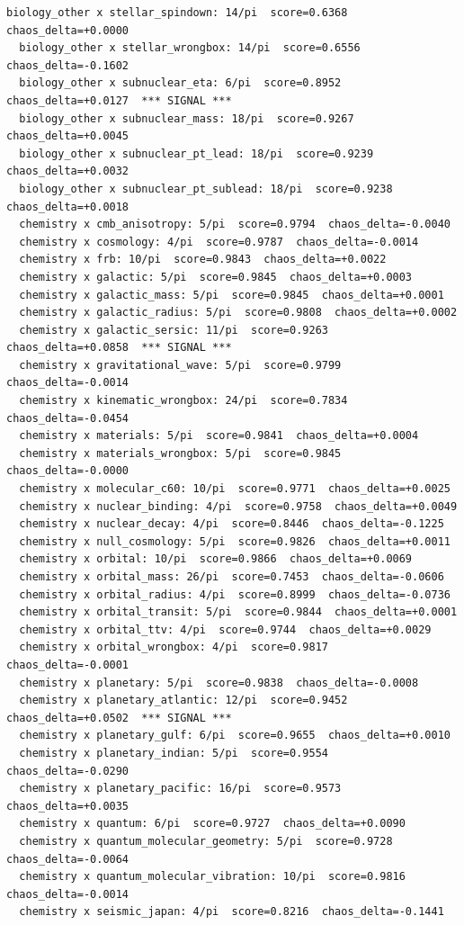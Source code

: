\documentclass[11pt, letterpaper, openany]{book}
\begin{document}
\begin{empiricalbox}
\begin{lstlisting}[style=terminal]
  biology_other x stellar_spindown: 14/pi  score=0.6368  chaos_delta=+0.0000
  biology_other x stellar_wrongbox: 14/pi  score=0.6556  chaos_delta=-0.1602
  biology_other x subnuclear_eta: 6/pi  score=0.8952  chaos_delta=+0.0127  *** SIGNAL ***
  biology_other x subnuclear_mass: 18/pi  score=0.9267  chaos_delta=+0.0045
  biology_other x subnuclear_pt_lead: 18/pi  score=0.9239  chaos_delta=+0.0032
  biology_other x subnuclear_pt_sublead: 18/pi  score=0.9238  chaos_delta=+0.0018
  chemistry x cmb_anisotropy: 5/pi  score=0.9794  chaos_delta=-0.0040
  chemistry x cosmology: 4/pi  score=0.9787  chaos_delta=-0.0014
  chemistry x frb: 10/pi  score=0.9843  chaos_delta=+0.0022
  chemistry x galactic: 5/pi  score=0.9845  chaos_delta=+0.0003
  chemistry x galactic_mass: 5/pi  score=0.9845  chaos_delta=+0.0001
  chemistry x galactic_radius: 5/pi  score=0.9808  chaos_delta=+0.0002
  chemistry x galactic_sersic: 11/pi  score=0.9263  chaos_delta=+0.0858  *** SIGNAL ***
  chemistry x gravitational_wave: 5/pi  score=0.9799  chaos_delta=-0.0014
  chemistry x kinematic_wrongbox: 24/pi  score=0.7834  chaos_delta=-0.0454
  chemistry x materials: 5/pi  score=0.9841  chaos_delta=+0.0004
  chemistry x materials_wrongbox: 5/pi  score=0.9845  chaos_delta=-0.0000
  chemistry x molecular_c60: 10/pi  score=0.9771  chaos_delta=+0.0025
  chemistry x nuclear_binding: 4/pi  score=0.9758  chaos_delta=+0.0049
  chemistry x nuclear_decay: 4/pi  score=0.8446  chaos_delta=-0.1225
  chemistry x null_cosmology: 5/pi  score=0.9826  chaos_delta=+0.0011
  chemistry x orbital: 10/pi  score=0.9866  chaos_delta=+0.0069
  chemistry x orbital_mass: 26/pi  score=0.7453  chaos_delta=-0.0606
  chemistry x orbital_radius: 4/pi  score=0.8999  chaos_delta=-0.0736
  chemistry x orbital_transit: 5/pi  score=0.9844  chaos_delta=+0.0001
  chemistry x orbital_ttv: 4/pi  score=0.9744  chaos_delta=+0.0029
  chemistry x orbital_wrongbox: 4/pi  score=0.9817  chaos_delta=-0.0001
  chemistry x planetary: 5/pi  score=0.9838  chaos_delta=-0.0008
  chemistry x planetary_atlantic: 12/pi  score=0.9452  chaos_delta=+0.0502  *** SIGNAL ***
  chemistry x planetary_gulf: 6/pi  score=0.9655  chaos_delta=+0.0010
  chemistry x planetary_indian: 5/pi  score=0.9554  chaos_delta=-0.0290
  chemistry x planetary_pacific: 16/pi  score=0.9573  chaos_delta=+0.0035
  chemistry x quantum: 6/pi  score=0.9727  chaos_delta=+0.0090
  chemistry x quantum_molecular_geometry: 5/pi  score=0.9728  chaos_delta=-0.0064
  chemistry x quantum_molecular_vibration: 10/pi  score=0.9816  chaos_delta=-0.0014
  chemistry x seismic_japan: 4/pi  score=0.8216  chaos_delta=-0.1441

\end{lstlisting}
\end{empiricalbox}
\end{document}
